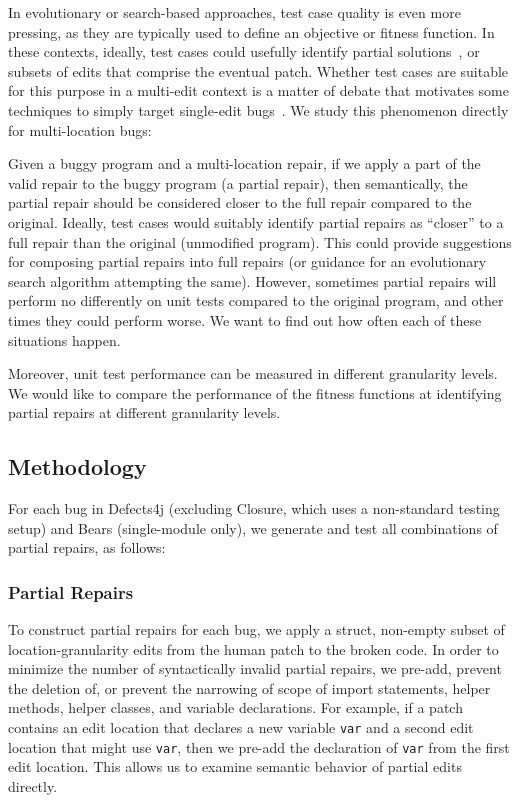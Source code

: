 \documentclass[sigconf, timestamp-false, anonymous=true]{acmart}
\begin{document}
In evolutionary or search-based approaches, test case quality is
even more pressing, as they are typically used to define an objective or
fitness function.  In these contexts, ideally, test cases could usefully
identify partial solutions~\cite{better-fitness}, or subsets of edits that comprise the eventual
patch. Whether test cases are suitable for this purpose in a multi-edit context
is a matter of debate that motivates some techniques to simply target
single-edit bugs~\cite{ae,rsrepair}. We study this phenomenon directly for
multi-location bugs:


Given a buggy program and a multi-location repair, if we apply a part of the valid repair to 
the buggy program (a partial repair), then semantically, the partial repair should be considered closer
 to the full repair compared to the original. 
Ideally, test cases would suitably identify partial repairs as ``closer'' to a full repair than the original (unmodified program).  This could provide suggestions for composing partial repairs into full repairs (or guidance for an evolutionary search algorithm attempting the same).
%
However, sometimes partial repairs will perform no differently on unit tests compared 
to the original program, and other times they could perform worse. We want to find 
out how often each of these situations happen.

Moreover, unit test performance can be measured in different granularity levels. 
We would like to compare the performance of the fitness functions at identifying 
partial repairs at different granularity levels.


\subsection{Methodology}
\label{sec:partial-repair-methodology}

For each bug in  Defects4j 
(excluding Closure, which uses a non-standard testing setup)
and Bears (single-module only), we generate and test all combinations of partial repairs, as follows: 

\subsubsection{Partial Repairs}

To construct partial repairs for each bug, we apply a struct, non-empty subset 
of location-granularity edits from the human patch to the broken code.
In order to minimize the number of syntactically invalid partial repairs, 
we pre-add, prevent the deletion of, or prevent the narrowing of scope of 
import statements, helper methods, helper classes, and variable declarations.
For example, if a patch contains an edit location that declares a new variable 
\texttt{var} and a second edit location that might use \texttt{var}, then we 
pre-add the declaration of \texttt{var} from the first edit location. 
This allows us to examine semantic behavior of partial edits directly.
\end{document}
